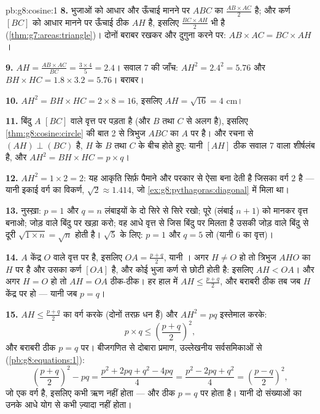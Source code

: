 \begin{solution}{pb:g8:cosine:1}
\textbf{8.}  भुजाओं को आधार और ऊँचाई मानने पर $ABC$ का
 $\frac{AB \times AC}{2}$ है; और कर्ण $[BC]$ को आधार मानने
पर ऊँचाई ठीक $AH$ है, इसलिए 
$\frac{BC \times AH}{2}$ भी है (\cref{thm:g7:areas:triangle})।
दोनों बराबर रखकर और दुगुना करने पर: $AB \times AC = BC \times AH$।

\textbf{9.} $AH = \frac{AB \times AC}{BC} = \frac{3 \times 4}{5}
= 2.4$। सवाल 7 की जाँच: $AH^2 = 2.4^2 = 5.76$ और
$BH \times HC = 1.8 \times 3.2 = 5.76$। बराबर।

\textbf{10.} $AH^2 = BH \times HC = 2 \times 8 = 16$, इसलिए
$AH = \sqrt{16} = 4$ cm।

\textbf{11.} बिंदु $A$  $[BC]$ वाले वृत्त पर पड़ता है (और $B$
तथा $C$ से अलग है), इसलिए \cref{thm:g8:cosine:circle} की बात 2 से
त्रिभुज $ABC$ का $A$ पर  है। और रचना से $(AH) \perp (BC)$ है,
$H$ के $B$ तथा $C$ के बीच होते हुए: यानी  $[AH]$ ठीक सवाल 7
वाला शीर्षलंब है, और $AH^2 = BH \times HC = p \times q$।

\textbf{12.} $AH^2 = 1 \times 2 = 2$: यह आकृति सिर्फ़ पैमाने और
परकार से ऐसा  बना देती है जिसका वर्ग $2$ है --- यानी इकाई
वर्ग का विकर्ण, $\sqrt2 \approx 1.414$, जो
\cref{ex:g8:pythagoras:diagonal} में मिला था।

\textbf{13.} नुस्ख़ा: $p = 1$ और $q = n$ लंबाइयों के दो 
सिरे से सिरे रखो; पूरे  (लंबाई $n + 1$) को  मानकर 
वृत्त बनाओ; जोड़ वाले बिंदु पर  खड़ा करो; वह आधे वृत्त से जिस
बिंदु पर मिलता है उसकी जोड़ वाले बिंदु से दूरी
$\sqrt{1 \times n} = \sqrt n$ होती है। $\sqrt5$ के लिए: $p = 1$
और $q = 5$ लो (यानी  $6$ का  वृत्त)।

\textbf{14.} $A$ केंद्र $O$ वाले वृत्त पर है, इसलिए
$OA = \frac{p+q}{2}$, यानी । अगर $H \neq O$ हो तो त्रिभुज
$AHO$ का $H$ पर  है और उसका कर्ण $[OA]$ है, और कोई  भुजा
कर्ण से छोटी होती है: इसलिए $AH < OA$। और अगर $H = O$ हो तो
$AH = OA$ ठीक-ठीक। हर हाल में $AH \leq \frac{p+q}{2}$, और बराबरी
ठीक तब जब $H$ केंद्र पर हो --- यानी जब $p = q$।

\textbf{15.} $AH \leq \frac{p+q}{2}$ का वर्ग करके (दोनों तरफ़ धन
हैं) और $AH^2 = pq$ इस्तेमाल करके:
\[
p \times q \leq \left(\frac{p+q}{2}\right)^2 ,
\]
और बराबरी ठीक $p = q$ पर। बीजगणित से दोबारा प्रमाण, उल्लेखनीय
सर्वसमिकाओं से (\cref{pb:g8:equations:1}):
\[
\left(\frac{p+q}{2}\right)^2 - pq
= \frac{p^2 + 2pq + q^2 - 4pq}{4}
= \frac{p^2 - 2pq + q^2}{4}
= \left(\frac{p-q}{2}\right)^2 ,
\]
जो एक वर्ग है, इसलिए कभी ऋण नहीं होता --- और ठीक $p = q$ पर 
होता है। यानी दो संख्याओं का  उनके आधे योग से कभी
ज़्यादा नहीं होता।

\end{solution}
